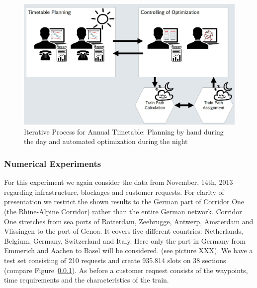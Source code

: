 \begin{figure}[htb]
	\centering
	\includegraphics[width=\textwidth]{Bilder/annual_planning.jpg}
	\caption{Iterative Process for Annual Timetable: Planning by hand during the day and automated optimization during the night}
	\label{fig:annual_planning}
\end{figure}

\subsubsection{Numerical Experiments}
For this experiment we again consider the data from November, 14th, 2013 regarding infrastructure, blockages and customer requests. For clarity of presentation we restrict the shown results to the German part of Corridor One (the Rhine-Alpine Corridor) \cite{} rather than the entire German network. Corridor One stretches from sea ports of Rotterdam, Zeebrugge, Antwerp, Amsterdam and Vlissingen to the port of Genoa. It covers five different countries: Netherlands, Belgium, Germany, Switzerland and Italy. Here only the part in Germany from Emmerich and Aachen to Basel will be considered. (see picture XXX). We have a test set consisting of 210 requests and create 935.814 slots on 38 sections (compare Figure~\ref{}).
As before a customer request consists of the waypoints, time requirements and the characteristics of the train.


